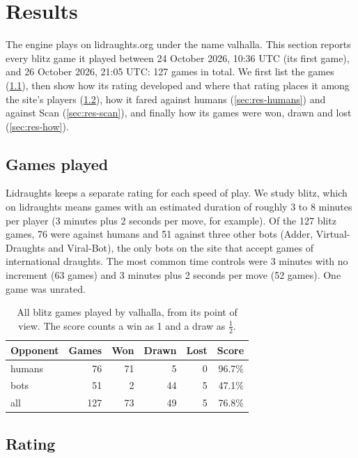 \section{Results}\label{sec:results}

The engine plays on lidraughts.org under the name valhalla. This section reports
every blitz game it played between 24 October 2026, 10:36 UTC (its first game),
and 26 October 2026, 21:05 UTC: 127 games in total. We first list the games
(\cref{sec:res-games}), then show how its rating developed and where that rating
places it among the site's players (\cref{sec:res-rating}), how it fared
against humans (\cref{sec:res-humans}) and against Scan (\cref{sec:res-scan}),
and finally how its games were won, drawn and lost (\cref{sec:res-how}).

\subsection{Games played}\label{sec:res-games}

Lidraughts keeps a separate rating for each speed of play. We study blitz, which
on lidraughts means games with an estimated duration of roughly 3 to 8 minutes
per player (3 minutes plus 2 seconds per move, for example). Of the 127 blitz
games, 76 were against humans and 51 against three other bots (Adder,
Virtual-Draughts and Viral-Bot), the only bots on the site that accept games of
international draughts. The most common time controls were 3 minutes with no
increment (63 games) and 3 minutes plus 2 seconds per move (52 games). One game
was unrated.

\begin{table}[ht]
  \centering
  \caption{All blitz games played by valhalla, from its point of view. The score
  counts a win as 1 and a draw as $\tfrac12$.}\label{tab:record}
  \begin{tabular}{lrrrrr}
    \toprule
    Opponent & Games & Won & Drawn & Lost & Score \\
    \midrule
    humans & 76 & 71 &  5 & 0 & 96.7\% \\
    bots   & 51 &  2 & 44 & 5 & 47.1\% \\
    \midrule
    all    & 127 & 73 & 49 & 5 & 76.8\% \\
    \bottomrule
  \end{tabular}
\end{table}

\subsection{Rating}\label{sec:res-rating}

